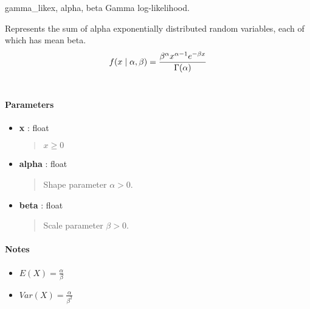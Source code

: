 \hypertarget{pymc.distributions.gamma_like}{}\begin{funcdesc}{gamma\_like}{x, alpha, beta}
Gamma log-likelihood.

Represents the sum of alpha exponentially distributed random variables, each
of which has mean beta.
\begin{gather}
\begin{split}f(x \mid \alpha, \beta) = \frac{\beta^{\alpha}x^{\alpha-1}e^{-\beta x}}{\Gamma(\alpha)}\end{split}\notag\\\begin{split}\end{split}\notag
\end{gather}
\paragraph{Parameters}
\begin{itemize}
\item[] \textbf{x} : float
\begin{quote}

$x \ge 0$
\end{quote}

\item[] \textbf{alpha} : float
\begin{quote}

Shape parameter $\alpha > 0$.
\end{quote}

\item[] \textbf{beta} : float
\begin{quote}

Scale parameter $\beta > 0$.
\end{quote}
\end{itemize}
\paragraph{Notes}
\begin{itemize}
\item {} 
$E(X) = \frac{\alpha}{\beta}$

\item {} 
$Var(X) = \frac{\alpha}{\beta^2}$

\end{itemize}
\end{funcdesc}

